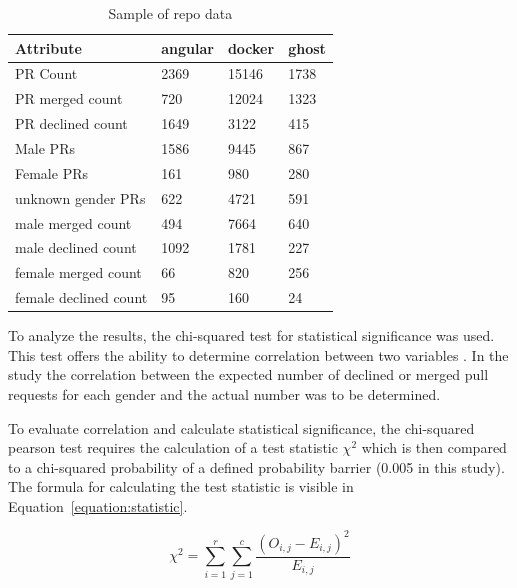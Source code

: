 \begin{table}[!t]
	\renewcommand{\arraystretch}{1.3}
	\caption{Sample of repo data}
	\label{table:sampledata}
	\centering

	\begin{tabular} { l | l | l | l  }
		\textbf{Attribute} 			& 	\textbf{angular}		&	\textbf{docker}	&	\textbf{ghost}	\\ \hline

		PR Count		&2369	&	15146&1738 \\
		PR merged count 	&720	&	12024&1323 \\
		PR declined count 	&1649	&	3122 &415  \\
		Male PRs		&1586	&	9445 &867  \\
		Female PRs		&161	&	980  &280  \\
		unknown gender PRs	&622	&	4721 &591  \\
		male merged count  	&494	&	7664 &640  \\
		male declined count	&1092	&	1781 &227  \\
		female merged count	&66	&	820  &256  \\
		female declined count	&95	&	160  &24   \\


	\end{tabular}
\end{table}

To analyze the results, the chi-squared test for statistical significance was used. This test offers the ability to determine correlation between two variables  \cite[p.102ff.]{chi2016springer}. In the study the correlation between the expected number of declined or merged pull requests for each gender and the actual number was to be determined.

To evaluate correlation and calculate statistical significance, the chi-squared pearson test requires the calculation of a test statistic $ \chi^2 $ which is then compared to a chi-squared probability of a defined probability barrier (0.005 in this study). The formula for calculating the test statistic is visible in Equation~\ref{equation:statistic}.

\begin{equation}
    \label{equation:statistic}
\chi^2= \sum_{i=1}^{r} \sum_{j=1}^{c} \frac{(O_{i,j} - E_{i,j})^2}{E_{i,j}}
\end{equation}

